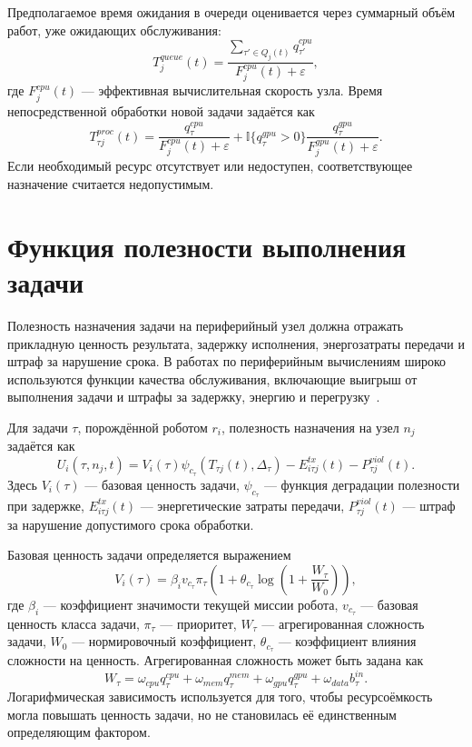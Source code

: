 Предполагаемое время ожидания в очереди оценивается через суммарный объём работ, уже ожидающих обслуживания:
\begin{equation}
    T^{queue}_{j}(t)=\frac{\sum_{\tau'\in Q_j(t)} q^{cpu}_{\tau'}}{F^{cpu}_{j}(t)+\varepsilon},
    \label{eq:ch2_queue_time}
\end{equation}
где $F^{cpu}_{j}(t)$ --- эффективная вычислительная скорость узла. Время непосредственной обработки новой задачи задаётся как
\begin{equation}
    T^{proc}_{\tau j}(t)=\frac{q^{cpu}_{\tau}}{F^{cpu}_{j}(t)+\varepsilon}+\mathbb{I}\{q^{gpu}_{\tau}>0\}\frac{q^{gpu}_{\tau}}{F^{gpu}_{j}(t)+\varepsilon}.
    \label{eq:ch2_process_time}
\end{equation}
Если необходимый ресурс отсутствует или недоступен, соответствующее назначение считается недопустимым.

\section{Функция полезности выполнения задачи}

Полезность назначения задачи на периферийный узел должна отражать прикладную ценность результата, задержку исполнения, энергозатраты передачи и штраф за нарушение срока. В работах по периферийным вычислениям широко используются функции качества обслуживания, включающие выигрыш от выполнения задачи и штрафы за задержку, энергию и перегрузку~\cite{Mao2017MECPerspective,Mach2017MECSurvey,Luo2021ResourceScheduling}.

Для задачи $\tau$, порождённой роботом $r_i$, полезность назначения на узел $n_j$ задаётся как
\begin{equation}
    U_i(\tau,n_j,t)=V_i(\tau)\psi_{c_{\tau}}(T_{\tau j}(t),\Delta_{\tau})-E^{tx}_{i\tau j}(t)-P^{viol}_{\tau j}(t).
    \label{eq:ch2_utility}
\end{equation}
Здесь $V_i(\tau)$ --- базовая ценность задачи, $\psi_{c_{\tau}}$ --- функция деградации полезности при задержке, $E^{tx}_{i\tau j}(t)$ --- энергетические затраты передачи, $P^{viol}_{\tau j}(t)$ --- штраф за нарушение допустимого срока обработки.

Базовая ценность задачи определяется выражением
\begin{equation}
    V_i(\tau)=\beta_i v_{c_{\tau}}\pi_{\tau}\left(1+\theta_{c_{\tau}}\log\left(1+\frac{W_{\tau}}{W_0}\right)\right),
    \label{eq:ch2_base_value}
\end{equation}
где $\beta_i$ --- коэффициент значимости текущей миссии робота, $v_{c_{\tau}}$ --- базовая ценность класса задачи, $\pi_{\tau}$ --- приоритет, $W_{\tau}$ --- агрегированная сложность задачи, $W_0$ --- нормировочный коэффициент, $\theta_{c_{\tau}}$ --- коэффициент влияния сложности на ценность. Агрегированная сложность может быть задана как
\begin{equation}
    W_{\tau}=\omega_{cpu}q^{cpu}_{\tau}+\omega_{mem}q^{mem}_{\tau}+\omega_{gpu}q^{gpu}_{\tau}+\omega_{data}b^{in}_{\tau}.
    \label{eq:ch2_task_complexity}
\end{equation}
Логарифмическая зависимость используется для того, чтобы ресурсоёмкость могла повышать ценность задачи, но не становилась её единственным определяющим фактором.

